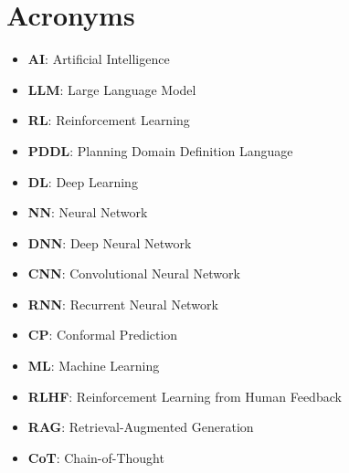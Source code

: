 \chapter{Acronyms}
\label{apx:acronyms}
\begin{itemize}
  \item \textbf{AI}: Artificial Intelligence

  \item \textbf{LLM}: Large Language Model

  \item \textbf{RL}: Reinforcement Learning

  \item \textbf{PDDL}: Planning Domain Definition Language

  \item \textbf{DL}: Deep Learning

  \item \textbf{NN}: Neural Network

  \item \textbf{DNN}: Deep Neural Network

  \item \textbf{CNN}: Convolutional Neural Network

  \item \textbf{RNN}: Recurrent Neural Network

  \item \textbf{CP}: Conformal Prediction

  \item \textbf{ML}: Machine Learning

  \item \textbf{RLHF}: Reinforcement Learning from Human Feedback

  \item \textbf{RAG}: Retrieval-Augmented Generation

  \item \textbf{CoT}: Chain-of-Thought
\end{itemize}